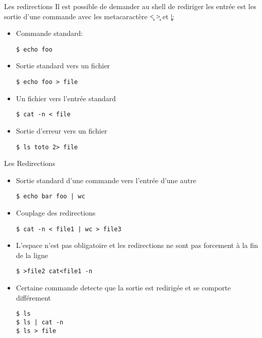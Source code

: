 \begin{frame}[fragile=singleslide]{Les redirections}
  Il est possible de demander au shell de rediriger les entrée est les
  sortie d'une commande avec les metacaractère \c{<} \c{>} et \c{|}:
  \begin{itemize}
  \item Commande standard:
    \begin{lstlisting}
$ echo foo
    \end{lstlisting}
  \item Sortie standard vers un fichier
    \begin{lstlisting}
$ echo foo > file
    \end{lstlisting}
  \item Un fichier vers l'entrée standard
    \begin{lstlisting}
$ cat -n < file
    \end{lstlisting} %
  \item Sortie d'erreur vers un fichier
    \begin{lstlisting}
$ ls toto 2> file
    \end{lstlisting} %
  \end{itemize}
\end{frame}

\begin{frame}[fragile=singleslide]{Les Redirections}
  \begin{itemize}
  \item Sortie standard d'une commande vers l'entrée d'une autre
    \begin{lstlisting}
$ echo bar foo | wc
    \end{lstlisting}
  \item Couplage des redirections
    \begin{lstlisting}
$ cat -n < file1 | wc > file3
    \end{lstlisting} %
  \item L'espace n'est pas obligatoire et les redirections ne sont pas
    forcement à la fin de la ligne
    \begin{lstlisting}
$ >file2 cat<file1 -n
    \end{lstlisting} %
  \item Certaine commande detecte que la sortie est redirigée et se
    comporte différement
    \begin{lstlisting}
$ ls
$ ls | cat -n
$ ls > file
    \end{lstlisting}
  \end{itemize}
\end{frame}

